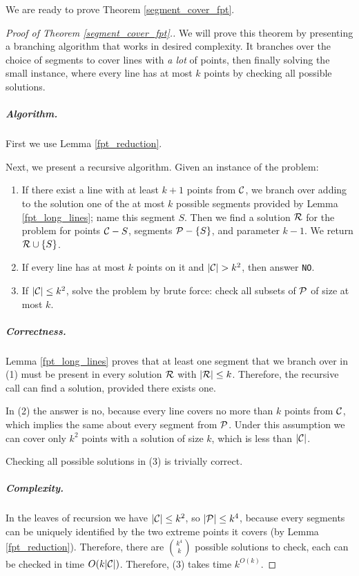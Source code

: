 We are ready to prove Theorem \ref{segment_cover_fpt}.

\begin{proof}[Proof of Theorem \ref{segment_cover_fpt}.]\leavevmode

We will prove this theorem by presenting a branching algorithm that
works in desired complexity. It branches over the
choice of segments to cover lines with \textit{a lot} of points,
then finally solving the small instance, where
every line has at most $k$ points by checking all possible solutions.

\subparagraph{Algorithm.}
First we use Lemma \ref{fpt_reduction}.

Next, we present a recursive algorithm. Given an instance of the problem:

\begin{enumerate}[label={(\arabic*)}]
\item If there exist a line with at least $k+1$ points from $\mathcal{C}$, we branch over
adding to the solution one of the at most $k$ possible segments
provided by Lemma \ref{fpt_long_lines}; name this segment $S$.
Then we find a solution $\mathcal{R}$
for the problem for points $\mathcal{C} - S$, segments $\mathcal{P} - \{S\}$,
and parameter $k-1$. We return $\mathcal{R} \cup \{S\}$.
\item If every line has at most $k$ points on it and $|\mathcal{C}| > k^2$,
then answer \texttt{NO}.
\item If $|\mathcal{C}| \le k^2$, solve the problem by brute force:
check all subsets of $\mathcal{P}$ of size at most $k$.
\end{enumerate}

\subparagraph{Correctness.}

Lemma \ref{fpt_long_lines} proves that at least one segment that we
branch over in (1) must be present in every solution $\mathcal{R}$ with $|\mathcal{R}| \le k$.
Therefore, the recursive call can find a solution, provided there exists one.

In (2) the answer is no, because every line covers no more than $k$ points
from $\mathcal{C}$, which implies the same about every segment from $\mathcal{P}$.
Under this assumption
we can cover only $k^2$ points with a solution of size $k$, which is less
than $|\mathcal{C}|$.

Checking all possible solutions in (3) is trivially correct.


\subparagraph{Complexity.}

In the leaves of recursion we have $|\mathcal{C}| \le k^2$, so $|\mathcal{P}| \le k^4$, because
every segments can be uniquely identified by the two extreme points it covers
(by Lemma \ref{fpt_reduction}). Therefore, there are $\binom{k^4}{k}$
possible solutions to check, each can be checked in time $O(k|\mathcal{C}|)$.
Therefore, (3) takes time $k^{O(k)}$.



\end{proof}
